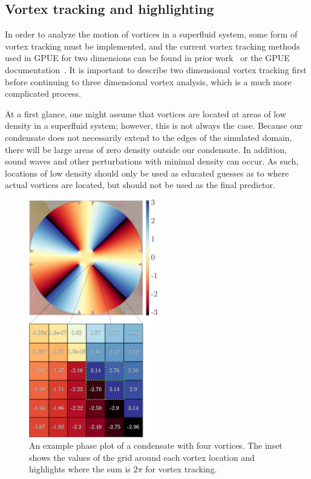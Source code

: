 \subsection{Vortex tracking and highlighting}
\label{sec:tracking}

In order to analyze the motion of vortices in a superfluid system, some form of vortex tracking must be implemented, and the current vortex tracking methods used in GPUE for two dimensions can be found in prior work~\cite{o2017} or the GPUE documentation~\cite{docs}.
It is important to describe two dimensional vortex tracking first before continuing to three dimensional vortex analysis, which is a much more complicated process.

At a first glance, one might assume that vortices are located at areas of low density in a superfluid system; however, this is not always the case.
Because our condensate does not necessarily extend to the edges of the simulated domain, there will be large areas of zero density outside our condensate.
In addition, sound waves and other perturbations with minimal density can occur.
As such, locations of low density should only be used as educated guesses as to where actual vortices are located, but should not be used as the final predictor.

\begin{figure}
\center \includegraphics[width = 0.5\textwidth]{data/gpu/vortex_tracking/phi_grid.png}
\caption{An example phase plot of a condensate with four vortices.
The inset shows the values of the grid around each vortex location and highlights where the sum is $2\pi$ for vortex tracking.
}
\label{fig:phase}
\end{figure}

